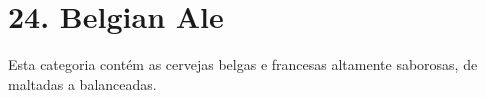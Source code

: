 \section*{24. Belgian Ale}
Esta categoria contém as cervejas belgas e francesas altamente saborosas, de maltadas a balanceadas.
